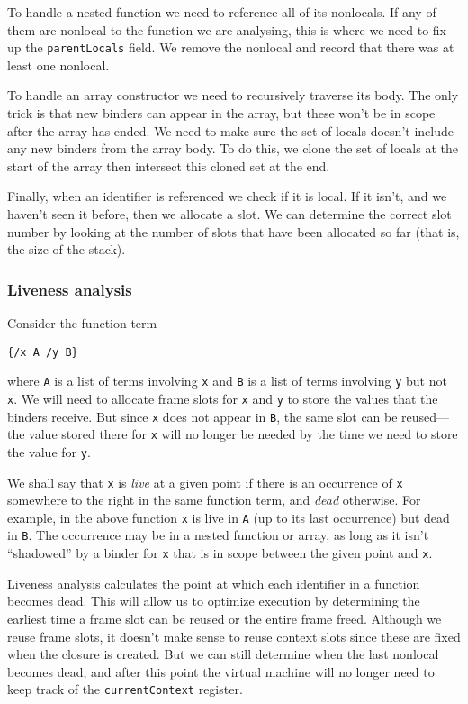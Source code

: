 To handle a nested function we need to reference all of its nonlocals.
If any of them are nonlocal to the function we are analysing,
this is where we need to fix up the \verb!parentLocals! field.
We remove the nonlocal and record that there was at least one nonlocal.

To handle an array constructor we need to recursively traverse its body.
The only trick is that new binders can appear in the array,
but these won't be in scope after the array has ended.
We need to make sure the set of locals doesn't include
any new binders from the array body.
To do this,
we clone the set of locals at the start of the array
then intersect this cloned set at the end.

Finally,
when an identifier is referenced we check if it is local.
If it isn't, and we haven't seen it before,
then we allocate a slot.
We can determine the correct slot number by looking at
the number of slots that have been allocated so far
(that is, the size of the stack).


\subsubsection{Liveness analysis\label{sec:liveness}}

Consider the function term
\begin{center}
\verb!{/x A /y B}!
\end{center}
where \verb!A! is a list of terms involving \verb!x!
and \verb!B! is a list of terms involving \verb!y! but not \verb!x!.
We will need to allocate frame slots for \verb!x! and \verb!y! to store
the values that the binders receive.
But since \verb!x! does not appear in \verb!B!,
the same slot can be reused---%
the value stored there for \verb!x! will no longer be needed
by the time we need to store the value for \verb!y!.

We shall say that \verb!x! is \emph{live} at a given point
if there is an occurrence of \verb!x! somewhere to the right
in the same function term,
and \emph{dead} otherwise.
For example, in the above function \verb!x! is live in \verb!A!
(up to its last occurrence)
but dead in \verb!B!.
The occurrence may be in a nested function or array,
as long as it isn't ``shadowed'' by a binder for \verb!x!
that is in scope between the given point and \verb!x!.

Liveness analysis calculates the point at which
each identifier in a function becomes dead.
This will allow us to optimize execution by determining
the earliest time a frame slot can be reused or the entire frame freed.
Although we reuse frame slots,
it doesn't make sense to reuse context slots
since these are fixed when the closure is created.
But we can still determine when the last nonlocal becomes dead,
and after this point the virtual machine
will no longer need to keep track of the \verb!currentContext! register.

